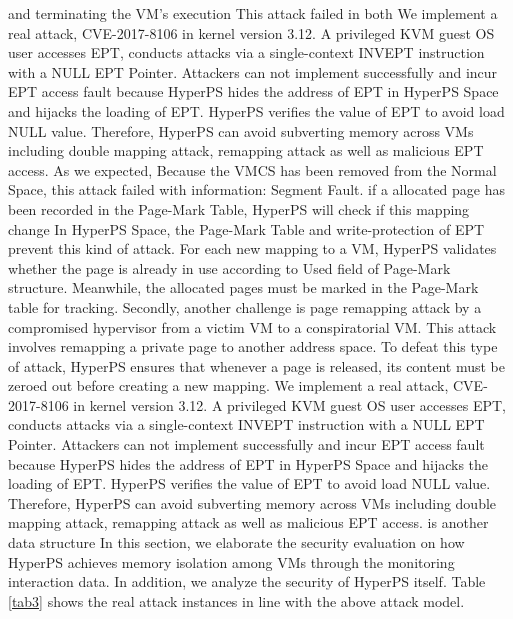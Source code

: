 \iffalse
and terminating the VM's execution 
This attack failed in both  
We implement a real attack, CVE-2017-8106 in kernel version 3.12. A privileged KVM guest OS user accesses EPT, conducts attacks via a single-context INVEPT instruction with a NULL EPT Pointer. Attackers can not implement successfully and incur EPT access fault because HyperPS hides the address of EPT in HyperPS Space and hijacks the loading of EPT. HyperPS verifies the value of EPT to avoid load NULL value. Therefore, HyperPS can avoid subverting memory across VMs including double mapping attack, remapping attack as well as malicious EPT access.
As we expected, 
Because the VMCS has been removed from the Normal Space, this attack failed with information: Segment Fault. 
if a allocated page has been recorded in the Page-Mark Table, HyperPS will check if this mapping change
In HyperPS Space, the Page-Mark Table and write-protection of EPT prevent this kind of attack. For each new mapping to a VM, HyperPS validates whether the page is already in use according to Used field of Page-Mark structure. Meanwhile, the allocated pages must be marked in the Page-Mark table for tracking. Secondly, another challenge is page remapping attack by a compromised hypervisor from a victim VM to a conspiratorial VM. This attack involves remapping a private page to another address space. To defeat this type of attack, HyperPS ensures that whenever a page is released, its content must be zeroed out before creating a new mapping.
We implement a real attack, CVE-2017-8106 in kernel version 3.12. A privileged KVM guest OS user accesses EPT, conducts attacks via a single-context INVEPT instruction with a NULL EPT Pointer. Attackers can not implement successfully and incur EPT access fault because HyperPS hides the address of EPT in HyperPS Space and hijacks the loading of EPT. HyperPS verifies the value of EPT to avoid load NULL value. Therefore, HyperPS can avoid subverting memory across VMs including double mapping attack, remapping attack as well as malicious EPT access.
is another data structure
In this section, we elaborate the security evaluation on how HyperPS achieves memory isolation among VMs through the monitoring interaction data. 
In addition, we analyze the security of HyperPS itself. Table \ref{tab3} shows the real attack instances in line with the above attack model. 


